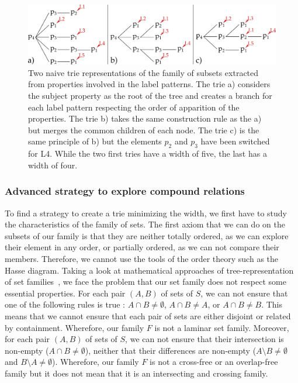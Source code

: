 \begin{figure}[ht!]
\centering
\includegraphics[width=\textwidth]{figures/chapter7/naive.png}
\caption{\label{fig:chap7_naive} Two naive trie representations of the family of subsets extracted from properties involved in the label patterns. The trie a) considers the subject property as the root of the tree and creates a branch for each label pattern respecting the order of apparition of the properties. The trie b) takes the same construction rule as the a) but merges the common children of each node. The trie c) is the same principle of b) but the elements $p_2$ and $p_3$ have been switched for L4. While the two first tries have a width of five, the last has a width of four.}
\end{figure}

\subsubsection{Advanced strategy to explore compound relations}

To find a strategy to create a trie minimizing the width, we first have to study the characteristics of the family of sets.
The first axiom that we can do on the subsets of our family is that they are neither totally ordered, as we can explore their element in any order, or partially ordered, as we can not compare their members. Therefore, we cannot use the tools of the order theory such as the Hasse diagram. Taking a look at mathematical approaches of tree-representation of set families~\cite{bui_2008_tree}, we face the problem that our set family does not respect some essential properties. For each pair $(A, B)$ of sets of $S$, we can not ensure that one of the following rules is true : $A \cap B \neq \emptyset$, $A \cap B \neq A$, or $A \cap B \neq B$. This means that we cannot ensure that each pair of sets are either disjoint or related by containment. Wherefore, our family $F$ is not a laminar set family.
Moreover, for each pair $(A, B)$ of sets of $S$, we can not ensure that their intersection is non-empty ($A \cap B \neq \emptyset$), neither that their differences are non-empty ($A \setminus B \neq \emptyset$ and $B \setminus A \neq \emptyset$). Wherefore, our family $F$ is not a cross-free or an overlap-free family but it does not mean that it is an intersecting and crossing family.

